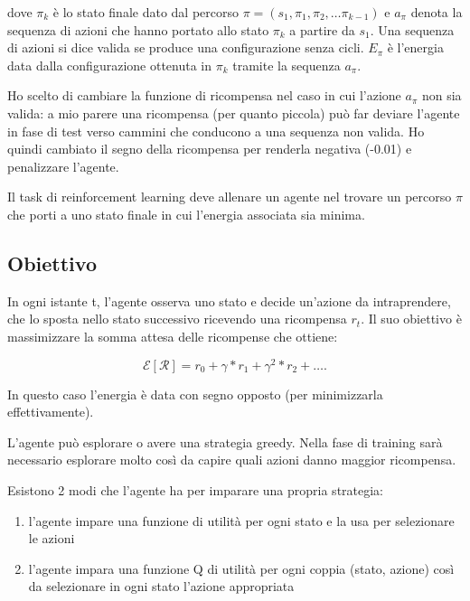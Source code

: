 \documentclass[conference]{IEEEtran}
\begin{document}
dove $\pi_k$ è lo stato finale dato dal percorso $\pi = (s_1, \pi_1, \pi_2, \dots \pi_{k-1})$ e $a_{\pi}$ denota la sequenza di azioni che hanno portato allo stato $\pi_k$ a partire da $s_1$. Una sequenza di azioni si dice valida se produce una configurazione senza cicli. $E_{\pi}$ è l'energia data dalla configurazione ottenuta in $\pi_k$ tramite la sequenza $a_{\pi}$.

Ho scelto di cambiare la funzione di ricompensa nel caso in cui l'azione $a_{\pi}$ non sia valida: a mio parere una ricompensa (per quanto piccola) può far deviare l'agente in fase di test verso cammini che conducono a una sequenza non valida. Ho quindi cambiato il segno della ricompensa per renderla negativa (-0.01) e penalizzare l'agente.

Il task di reinforcement learning deve allenare un agente nel trovare un percorso $\pi$ che porti a uno stato finale in cui l'energia associata sia minima.

\subsection{Obiettivo}

In ogni istante t, l'agente osserva uno stato e decide un'azione da intraprendere, che lo sposta nello stato successivo ricevendo una ricompensa $r_t$. Il suo obiettivo è massimizzare la somma attesa delle ricompense che ottiene:

\begin{equation}
\mathcal{E}[\mathcal{R}] = r_0 + \gamma*r_1 + \gamma^2*r_2 + \dots.
\end{equation}

In questo caso l'energia è data con segno opposto (per minimizzarla effettivamente).

L'agente può esplorare o avere una strategia greedy. Nella fase di training sarà necessario esplorare molto così da capire quali azioni danno maggior ricompensa.

Esistono 2 modi che l'agente ha per imparare una propria strategia:

\begin{enumerate}
 \item l'agente impare una funzione di utilità per ogni stato e la usa per selezionare le azioni
 \item l'agente impara una funzione Q di utilità per ogni coppia (stato, azione) così da selezionare in ogni stato l'azione appropriata
\end{enumerate}
\end{document}
